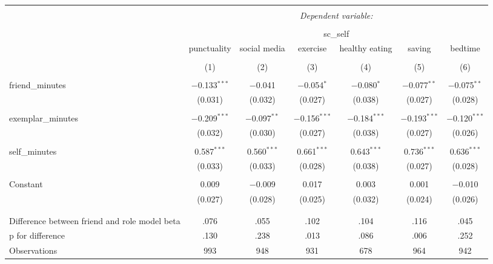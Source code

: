
\begin{table}[!htbp] \centering 
  \caption{} 
  \label{} 
\begin{tabular}{@{\extracolsep{5pt}}lcccccc} 
\\[-1.8ex]\hline 
\hline \\[-1.8ex] 
 & \multicolumn{6}{c}{\textit{Dependent variable:}} \\ 
\cline{2-7} 
\\[-1.8ex] & \multicolumn{6}{c}{sc\_self} \\ 
 & punctuality & social media & exercise & healthy eating & saving & bedtime \\ 
\\[-1.8ex] & (1) & (2) & (3) & (4) & (5) & (6)\\ 
\hline \\[-1.8ex] 
 friend\_minutes & $-$0.133$^{***}$ & $-$0.041 & $-$0.054$^{*}$ & $-$0.080$^{*}$ & $-$0.077$^{**}$ & $-$0.075$^{**}$ \\ 
  & (0.031) & (0.032) & (0.027) & (0.038) & (0.027) & (0.028) \\ 
  & & & & & & \\ 
 exemplar\_minutes & $-$0.209$^{***}$ & $-$0.097$^{**}$ & $-$0.156$^{***}$ & $-$0.184$^{***}$ & $-$0.193$^{***}$ & $-$0.120$^{***}$ \\ 
  & (0.032) & (0.030) & (0.027) & (0.038) & (0.027) & (0.026) \\ 
  & & & & & & \\ 
 self\_minutes & 0.587$^{***}$ & 0.560$^{***}$ & 0.661$^{***}$ & 0.643$^{***}$ & 0.736$^{***}$ & 0.636$^{***}$ \\ 
  & (0.033) & (0.033) & (0.028) & (0.038) & (0.027) & (0.028) \\ 
  & & & & & & \\ 
 Constant & 0.009 & $-$0.009 & 0.017 & 0.003 & 0.001 & $-$0.010 \\ 
  & (0.027) & (0.028) & (0.025) & (0.032) & (0.024) & (0.026) \\ 
  & & & & & & \\ 
\hline \\[-1.8ex] 
Difference between friend and role model beta & .076 & .055 & .102 & .104 & .116 & .045 \\ 
p for difference & .130 & .238 & .013 & .086 & .006 & .252 \\ 
Observations & 993 & 948 & 931 & 678 & 964 & 942 \\ 

\end{tabular}
\end{table}
